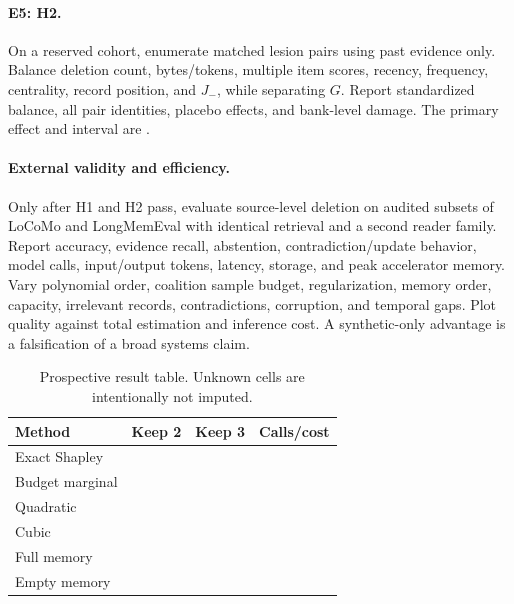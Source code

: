 \paragraph{E5: H2.}
On a reserved cohort, enumerate matched lesion pairs using past evidence only.
Balance deletion count, bytes/tokens, multiple item scores, recency, frequency,
centrality, record position, and \(J_-\), while separating \(G\). Report standardized
balance, all pair identities, placebo effects, and bank-level damage. The primary
effect and interval are .

\paragraph{External validity and efficiency.}
Only after H1 and H2 pass, evaluate source-level deletion on audited subsets of
LoCoMo and LongMemEval with identical retrieval and a second reader family. Report
accuracy, evidence recall, abstention, contradiction/update behavior, model calls,
input/output tokens, latency, storage, and peak accelerator memory. Vary polynomial
order, coalition sample budget, regularization, memory order, capacity, irrelevant
records, contradictions, corruption, and temporal gaps. Plot quality against total
estimation and inference cost. A synthetic-only advantage is a falsification of a
broad systems claim.

\begin{table}[t]
\caption{Prospective result table. Unknown cells are intentionally not imputed.}
\label{tab:prospective}
\centering
\small
\begin{tabular}{@{}lccc@{}}
\toprule
Method & Keep 2 & Keep 3 & Calls/cost \\
\midrule
Exact Shapley & \TODO{---} & \TODO{---} & \TODO{---} \\
Budget marginal & \TODO{---} & \TODO{---} & \TODO{---} \\
Quadratic & \TODO{---} & \TODO{---} & \TODO{---} \\
Cubic & \TODO{---} & \TODO{---} & \TODO{---} \\
Full memory & \multicolumn{2}{c}{\TODO{---}} & \TODO{---} \\
Empty memory & \multicolumn{2}{c}{\TODO{---}} & \TODO{---} \\
\bottomrule
\end{tabular}
\end{table}
